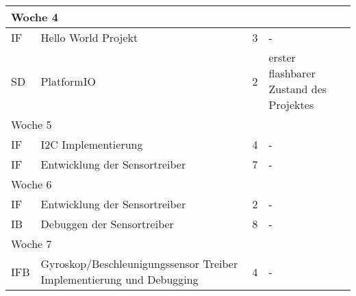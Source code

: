 \begin{table}[!hp]
\begin{center}
\begin{tabular}{|p{0.8cm}|p{6cm}|p{0.8cm}|p{8cm}|}
            \multicolumn{4}{|l|}{Woche 4}                                                                                                                                                          \\ \hline
            IF           & Hello World Projekt                                                  & 3             & -                                                                                \\
            SD           & PlatformIO                                                           & 2             & erster flashbarer Zustand des Projektes                                          \\ \hline
            \multicolumn{4}{|l|}{Woche 5}                                                                                                                                                          \\ \hline
            IF           & I2C Implementierung                                                  & 4             & -                                                                                \\
            IF           & Entwicklung der Sensortreiber                                        & 7             & -                                                                                \\ \hline
            \multicolumn{4}{|l|}{Woche 6}                                                                                                                                                          \\ \hline
            IF           & Entwicklung der Sensortreiber                                        & 2             & -                                                                                \\
            IB           & Debuggen der Sensortreiber                                           & 8             & -                                                                                \\ \hline
            \multicolumn{4}{|l|}{Woche 7}                                                                                                                                                          \\ \hline
            IFB          & Gyroskop/Beschleunigungssensor Treiber Implementierung und Debugging & 4             & -                                                                                \\

\end{tabular}
\end{center}
\end{table}
